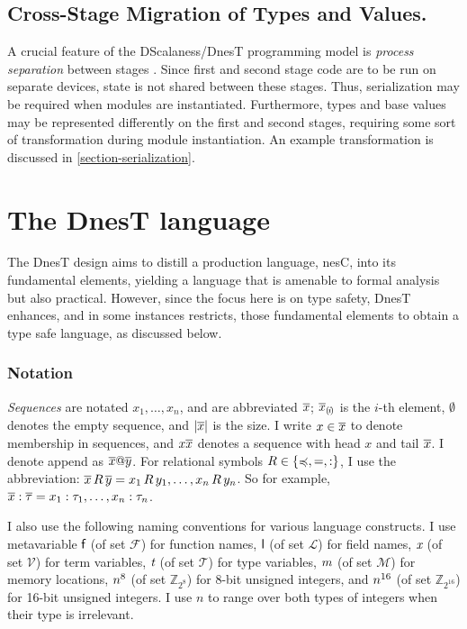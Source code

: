 \subsection{Cross-Stage Migration of Types and Values.} 

A crucial feature of the DScalaness/DnesT programming model is \emph{process separation} between
stages \cite{FramedML}. Since first and second stage code are to be run on separate devices,
state is not shared between these stages. Thus, serialization may be required when modules are
instantiated. Furthermore, types and base values may be represented differently on the first and
second stages, requiring some sort of transformation during module instantiation. An example
transformation is discussed in \autoref{section-serialization}.

\section{The DnesT language}
\label{section-nest-theory}
 
The DnesT design aims to distill a production language, nesC, into its fundamental elements,
yielding a language that is amenable to formal analysis but also practical. However, since the
focus here is on type safety, DnesT enhances, and in some instances restricts, those fundamental
elements to obtain a type safe language, as discussed below.

\subsubsection{Notation}

\emph{Sequences} are notated $x_1,\ldots,x_n$, and are abbreviated $\overline{x}$;
$\overline{x}_{(\mskip -2.5mu i\mskip -2.5mu)}$ is the $i$-th element, $\emptyset$ denotes the empty sequence, and
$|\overline{x}|$ is the size. I write $x \in \overline{x}$ to denote membership in sequences, and
$x\overline{x}$ denotes a sequence with head $x$ and tail $\overline{x}$. I denote append as
$\overline{x}@\overline{y}$. For relational symbols $R \in \{ \preccurlyeq, =, : \}$, I use the
abbreviation: $\overline{x}\, R\, \overline{y} = x_1\, R\, y_1, \ldots, x_n\, R\, y_n$. So for example,
$\overline{x} : \overline{\tau} = x_1 : \tau_1,\ldots,x_n : \tau_n$.

I also use the following naming conventions for various language constructs. I use metavariable
$\textsf{f}$ (of set $\mathcal{F}$) for function names, $\textsf{l}$ (of set $\mathcal{L}$) for field
names, $\textit{x}$ (of set $\mathcal{V}$) for term variables, $\textit{t}$ (of set $\mathcal{T}$) for type
variables, $m$ (of set $\mathcal{M}$) for memory locations, $n^{8}$ (of set
$\mathbb{Z}_{2^8}$) for 8-bit unsigned integers, and $n^{16}$ (of set $\mathbb{Z}_{2^{16}}$)
for 16-bit unsigned integers. I use $n$ to range over both types of integers when their type is
irrelevant.

